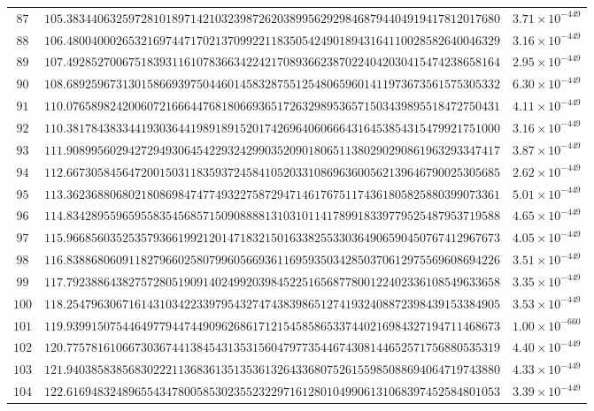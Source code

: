 \documentclass[12pt,reqno]{amsart}
\theoremstyle{remark}
\begin{document}
\begin{longtable}{clc}
$87$ & $105.3834406325972810189714210323987262038995629298468794404919417812017680$ & $3.71\times 10^{-449}$ \\
$88$ & $106.4800400026532169744717021370992211835054249018943164110028582640046329$ & $3.16\times 10^{-449}$ \\
$89$ & $107.4928527006751839311610783663422421708936623870224042030415474238658164$ & $2.95\times 10^{-449}$ \\
$90$ & $108.6892596731301586693975044601458328755125480659601411973673561575305332$ & $6.30\times 10^{-449}$ \\
$91$ & $110.0765898242006072166644768180669365172632989536571503439895518472750431$ & $4.11\times 10^{-449}$ \\
$92$ & $110.3817843833441930364419891891520174269640606664316453854315479921751000$ & $3.16\times 10^{-449}$ \\
$93$ & $111.9089956029427294930645422932429903520901806511380290290861963293347417$ & $3.87\times 10^{-449}$ \\
$94$ & $112.6673058456472001503118359372458410520331086963600562139646790025305685$ & $2.62\times 10^{-449}$ \\
$95$ & $113.3623688068021808698474774932275872947146176751174361805825880399073361$ & $5.01\times 10^{-449}$ \\
$96$ & $114.8342895596595583545685715090888813103101141789918339779525487953719588$ & $4.65\times 10^{-449}$ \\
$97$ & $115.9668560352535793661992120147183215016338255330364906590450767412967673$ & $4.05\times 10^{-449}$ \\
$98$ & $116.8388680609118279660258079960566936116959350342850370612975569608694226$ & $3.51\times 10^{-449}$ \\
$99$ & $117.7923886438275728051909140249920398452251656877800122402336108549633658$ & $3.35\times 10^{-449}$ \\
$100$ & $118.2547963067161431034223397954327474383986512741932408872398439153384905$ & $3.53\times 10^{-449}$ \\
$101$ & $119.9399150754464977944744909626861712154585865337440216984327194711468673$ & $1.00\times 10^{-660}$ \\
$102$ & $120.7757816106673036744138454313531560479773544674308144652571756880535319$ & $4.40\times 10^{-449}$ \\
$103$ & $121.9403858385683022211368361351353613264336807526155985088694064719743880$ & $4.33\times 10^{-449}$ \\
$104$ & $122.6169483248965543478005853023552322971612801049906131068397452584801053$ & $3.39\times 10^{-449}$ \\

\end{longtable}
\end{document}
